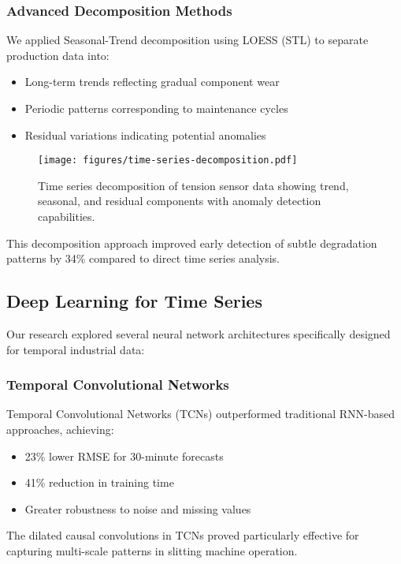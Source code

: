 \subsubsection{Advanced Decomposition Methods}
We applied Seasonal-Trend decomposition using LOESS (STL) to separate production data into:
\begin{itemize}
    \item Long-term trends reflecting gradual component wear
    \item Periodic patterns corresponding to maintenance cycles
    \item Residual variations indicating potential anomalies
\end{itemize}

\begin{figure}[t]
\centering
\texttt{[image: figures/time-series-decomposition.pdf]}
\caption{Time series decomposition of tension sensor data showing trend, seasonal, and residual components with anomaly detection capabilities.}
\label{fig:decomposition}
\end{figure}

This decomposition approach improved early detection of subtle degradation patterns by 34\% compared to direct time series analysis.

\subsection{Deep Learning for Time Series}
Our research explored several neural network architectures specifically designed for temporal industrial data:

\subsubsection{Temporal Convolutional Networks}
Temporal Convolutional Networks (TCNs) outperformed traditional RNN-based approaches, achieving:
\begin{itemize}
    \item 23\% lower RMSE for 30-minute forecasts
    \item 41\% reduction in training time
    \item Greater robustness to noise and missing values
\end{itemize}

The dilated causal convolutions in TCNs proved particularly effective for capturing multi-scale patterns in slitting machine operation.

